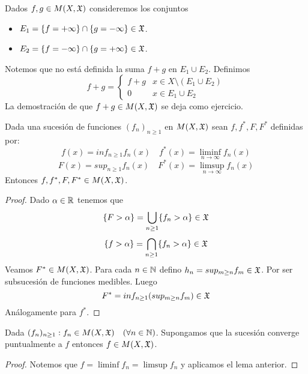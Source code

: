 \clearpage

\begin{note}
    Dados $f, g \in M(X, \mathfrak{X})$ consideremos los conjuntos \begin{itemize}
        \item $E_1 = \{ f = + \infty \} \cap \{ g = - \infty \} \in \mathfrak{X}$.
        \item $E_2 = \{ f = - \infty \} \cap \{ g = + \infty \} \in \mathfrak{X}$.
    \end{itemize}
    Notemos que no está definida la suma $f + g$ en $E_1 \cup E_2$.
    Definimos \begin{equation}
        f+g = \begin{cases}
            f+g & x \in X \setminus (E_1 \cup E_2) \\
            0   & x \in E_1 \cup E_2
        \end{cases}
    \end{equation}
    La demostración de que $f+g \in M(X, \mathfrak{X})$ se deja como ejercicio.
\end{note}

\begin{lemma}
    Dada una sucesión de funciones $(f_n)_{n \geq 1}$ en $M(X, \mathfrak{X})$ sean $f, f^*, F, F^*$ definidas por:
    \begin{equation}
        f(x) = inf_{n \geq 1} f_n(x) \quad f^*(x) = \liminf_{n \to \infty} f_n(x)
    \end{equation}
    \begin{equation}
        F(x) = sup_{n \geq 1} f_n(x) \quad F^*(x) = \limsup_{n \to \infty} f_n(x)
    \end{equation}
    Entonces $f, f^*, F, F^* \in M(X, \mathfrak{X})$.
    \begin{proof}
        Dado $\alpha \in \mathbb{R}$ tenemos que \begin{equation}
            \{ F > \alpha \} = \bigcup_{n \geq 1} \{ f_n > \alpha \} \in \mathfrak{X}
        \end{equation}
        \begin{equation}
            \{ f > \alpha \} = \bigcap_{n \geq 1} \{ f_n > \alpha \} \in \mathfrak{X}
        \end{equation}
        Veamos $F^* \in M(X, \mathfrak{X})$. Para cada $n \in \mathbb{N}$ defino $h_n = sup_{m \geq n} f_m \in \mathfrak{X}$. Por ser subsucesión de funciones medibles.
        Luego \begin{equation}
            F^* = inf_{n \geq 1} (sup_{m \geq n} f_m) \in \mathfrak{X}
        \end{equation}
        Análogamente para $f^*$.
    \end{proof}
\end{lemma}

\begin{corollary}
    Dada $(f_n)_{n \geq 1} : f_n \in M(X, \mathfrak{X}) \quad (\forall n \in \mathbb{N})$. Supongamos que la sucesión converge puntualmente a $f$ entonces $f \in M(X, \mathfrak{X})$.
    \begin{proof}
        Notemos que $f = \liminf f_n = \limsup f_n$ y aplicamos el lema anterior.
    \end{proof}
\end{corollary}